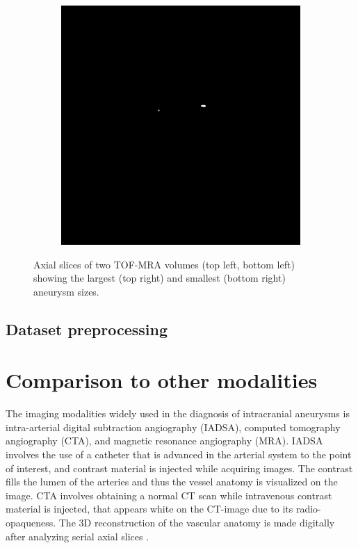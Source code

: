 \begin{figure}
\begin{subfigure}{0.9\linewidth}
		\includegraphics[width=0.5\linewidth]{figures/aneu-min.png}
	\end{subfigure}
	\caption[TOF-MRA axial slices and corresponding aneurysm label axial slices]{Axial slices of two TOF-MRA volumes (top left, bottom left) showing the largest (top right) and smallest (bottom right) aneurysm sizes.}
	\label{fig:ax-tof-aneus.png}
\end{figure}

\subsection{Dataset preprocessing}

\section{Comparison to other modalities}
The imaging modalities widely used in the diagnosis of intracranial aneurysms is intra-arterial digital subtraction angiography (IADSA), computed tomography angiography (CTA), and magnetic resonance angiography (MRA). IADSA involves the use of a catheter that is advanced in the arterial system to the point of interest, and contrast material is injected while acquiring images. The contrast fills the lumen of the arteries and thus the vessel anatomy is visualized on the image. CTA involves obtaining a normal CT scan while intravenous contrast material is injected, that appears white on the CT-image due to its radio-opaqueness. The 3D reconstruction of the vascular anatomy is made digitally after analyzing serial axial slices \cite{Keedy2006}.

